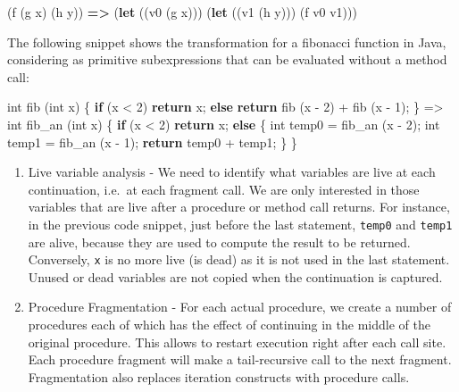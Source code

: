 \documentclass[12pt,a4paper,oneside,openright]{book}
\newenvironment{Shaded}{\begin{snugshade}}{\end{snugshade}}
\newcommand{\KeywordTok}[1]{\textcolor[rgb]{0.13,0.29,0.53}{\textbf{{#1}}}}
\newcommand{\DataTypeTok}[1]{\textcolor[rgb]{0.13,0.29,0.53}{{#1}}}
\newcommand{\DecValTok}[1]{\textcolor[rgb]{0.00,0.00,0.81}{{#1}}}
\newcommand{\FunctionTok}[1]{\textcolor[rgb]{0.00,0.00,0.00}{{#1}}}
\newcommand{\NormalTok}[1]{{#1}}
\providecommand{\tightlist}{%
  \setlength{\itemsep}{0pt}\setlength{\parskip}{0pt}}
\begin{document}
\begin{Shaded}
\begin{Highlighting}[]
    \NormalTok{(f (g x) (h y))}
        \KeywordTok{=>}
    \NormalTok{(}\KeywordTok{let} \NormalTok{((v0 (g x)))}
        \NormalTok{(}\KeywordTok{let} \NormalTok{((v1 (h y)))}
            \NormalTok{(f v0 v1)))}
\end{Highlighting}
\end{Shaded}

The following snippet shows the transformation for a fibonacci function
in Java, considering as primitive subexpressions that can be evaluated
without a method call:

\begin{Shaded}
\begin{Highlighting}[]
    \DataTypeTok{int} \FunctionTok{fib} \NormalTok{(}\DataTypeTok{int} \NormalTok{x) \{}
        \KeywordTok{if} \NormalTok{(x < }\DecValTok{2}\NormalTok{)}
            \KeywordTok{return} \NormalTok{x;}
        \KeywordTok{else}
            \KeywordTok{return} \FunctionTok{fib} \NormalTok{(x - }\DecValTok{2}\NormalTok{) + }\FunctionTok{fib} \NormalTok{(x - }\DecValTok{1}\NormalTok{);}
    \NormalTok{\}}
        \NormalTok{=>}
    \DataTypeTok{int} \FunctionTok{fib_an} \NormalTok{(}\DataTypeTok{int} \NormalTok{x) \{}
        \KeywordTok{if} \NormalTok{(x < }\DecValTok{2}\NormalTok{)}
            \KeywordTok{return} \NormalTok{x;}
        \KeywordTok{else} \NormalTok{\{}
            \DataTypeTok{int} \NormalTok{temp0 = }\FunctionTok{fib_an} \NormalTok{(x - }\DecValTok{2}\NormalTok{);}
            \DataTypeTok{int} \NormalTok{temp1 = }\FunctionTok{fib_an} \NormalTok{(x - }\DecValTok{1}\NormalTok{);}
            \KeywordTok{return} \NormalTok{temp0 + temp1;}
        \NormalTok{\}}
    \NormalTok{\}}
\end{Highlighting}
\end{Shaded}

\begin{enumerate}
\def\labelenumi{\arabic{enumi}.}
\setcounter{enumi}{2}
\tightlist
\item
  Live variable analysis - We need to identify what variables are live
  at each continuation, i.e.~at each fragment call. We are only
  interested in those variables that are live after a procedure or
  method call returns. For instance, in the previous code snippet, just
  before the last statement, \texttt{temp0} and \texttt{temp1} are
  alive, because they are used to compute the result to be returned.
  Conversely, \texttt{x} is no more live (is dead) as it is not used in
  the last statement. Unused or dead variables are not copied when the
  continuation is captured.
\item
  Procedure Fragmentation - For each actual procedure, we create a
  number of procedures each of which has the effect of continuing in the
  middle of the original procedure. This allows to restart execution
  right after each call site. Each procedure fragment will make a
  tail-recursive call to the next fragment. Fragmentation also replaces
  iteration constructs with procedure calls.
\end{enumerate}
\end{document}
